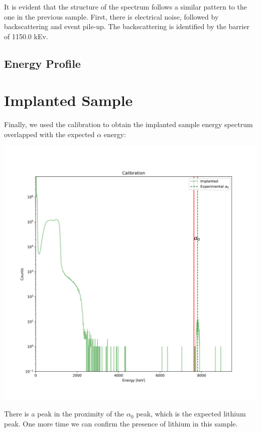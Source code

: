 \documentclass{article}
\begin{document}
\begin{multicols}{2}
It is evident that the structure of the spectrum follows a similar pattern to the one in the previous sample.
First, there is electrical noise, followed by backscattering and event pile-up. 
The backscattering is identified by the barrier of 1150.0 kEv.


\subsection{Energy Profile}



\section{Implanted Sample}

Finally, we used the calibration to obtain the implanted sample energy spectrum overlapped with the expected $\alpha$ energy:
\begin{center}
    \label{TT_21}
    \centering
    \includegraphics[scale = 0.35]{../../images/OverlapImplanted.png}
\end{center}

There is a peak in the proximity of the $\alpha_0$ peak, which is the expected lithium peak.
One more time we can confirm the presence of lithium in this sample.


\end{multicols}
\end{document}
